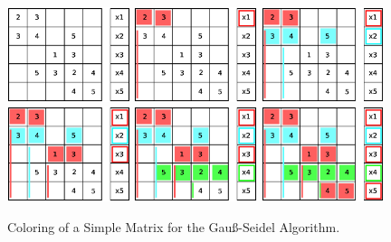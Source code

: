 \documentclass[a4paper,11pt]{scrartcl}
\begin{document}
\begin{figure}
\includegraphics[width=0.32\textwidth]{graphic/coloringGS1.eps}\hfill\vline\hfill
\includegraphics[width=0.32\textwidth]{graphic/coloringGS4.eps}\hfill\vline\hfill
\includegraphics[width=0.32\textwidth]{graphic/coloringGS7.eps}
\includegraphics[width=0.32\textwidth]{graphic/coloringGS8.eps}\hfill\vline\hfill
\includegraphics[width=0.32\textwidth]{graphic/coloringGS9.eps}\hfill\vline\hfill
\includegraphics[width=0.32\textwidth]{graphic/coloringGS10.eps}
\caption{Coloring of a Simple Matrix for the Gauß-Seidel Algorithm.}\label{figure:coloringGS}
\end{figure}
\end{document}
